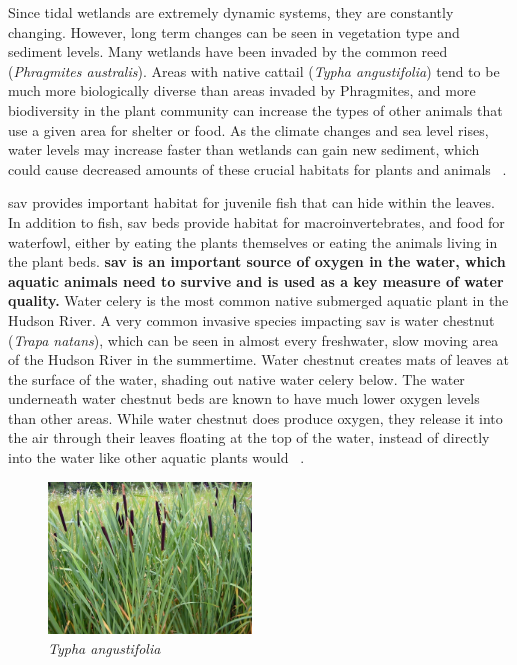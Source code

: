 Since tidal wetlands are extremely dynamic systems, they are constantly
changing. However, long term changes can be seen in vegetation type and
sediment levels. Many wetlands have been invaded by the common reed
(\textit{Phragmites australis}). Areas with native cattail (\textit{Typha
angustifolia}) tend to be much more biologically diverse than areas invaded by
Phragmites, and more biodiversity in the plant community can increase the types
of other animals that use a given area for shelter or food. As the climate
changes and sea level rises, water levels may increase faster than wetlands can
gain new sediment, which could cause decreased amounts of these crucial
habitats for plants and animals ~\citep{nysdectidal}. 
\par
\gls{sav} provides important habitat for juvenile fish that can hide within the
leaves. In addition to fish, \gls{sav} beds provide habitat for
macroinvertebrates, and food for waterfowl, either by eating the plants
themselves or eating the animals living in the plant beds. \textbf{\gls{sav} is
an important source of oxygen in the water, which aquatic animals need to
survive and is used as a key measure of water quality.} Water celery is the
most common native submerged aquatic plant in the Hudson River. A very common
invasive species impacting \gls{sav} is water chestnut (\textit{Trapa natans}),
which can be seen in almost every freshwater, slow moving area of the Hudson
River in the summertime. Water chestnut creates mats of leaves at the surface
of the water, shading out native water celery below. The water underneath water
chestnut beds are known to have much lower oxygen levels than other areas.
While water chestnut does produce oxygen, they release it into the air through
their leaves floating at the top of the water, instead of directly into the
water like other aquatic plants would ~\citep{nysdecsav}.

\vspace{3mm}
\begin{figure}
    \includegraphics[width=0.48\textwidth]{images/Cattail.jpg}
  \caption{\textit{Typha angustifolia}}
\end{figure}

